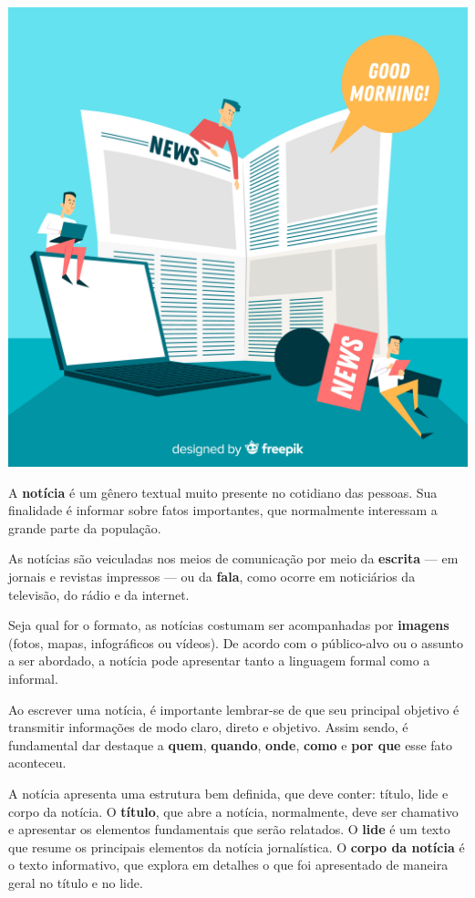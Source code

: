 \begin{conteudo}
\begin{conteudo}
\begin{conteudo}
\begin{conteudo}
{\begin{center}
\noindent\includegraphics[width=.7\textwidth]{media/image20a.jpeg}
\end{center}

A \textbf{notícia} é um gênero textual muito presente no
cotidiano das pessoas. Sua finalidade é informar sobre fatos importantes, 
que normalmente interessam a grande parte da população.

As notícias são veiculadas nos meios de comunicação por meio da
\textbf{escrita} --- em jornais e revistas impressos --- ou da \textbf{fala},
como ocorre em noticiários da televisão, do rádio e da internet.

Seja qual for o formato, as notícias costumam ser acompanhadas por
\textbf{imagens} (fotos, mapas, infográficos ou vídeos). De acordo com o
público-alvo ou o assunto a ser abordado, a notícia pode apresentar tanto a
linguagem formal como a informal.

Ao escrever uma notícia, é importante lembrar-se de que seu principal
objetivo é transmitir informações de modo claro, direto e objetivo. Assim sendo,
é fundamental dar destaque a \textbf{quem}, \textbf{quando},
\textbf{onde}, \textbf{como} e \textbf{por que} esse fato aconteceu.

A notícia apresenta uma estrutura bem definida, que deve conter: título,
lide e corpo da notícia. O \textbf{título}, que abre a notícia, normalmente,
deve ser chamativo e apresentar os elementos fundamentais que serão relatados.
O \textbf{lide} é um texto que resume os principais elementos da notícia jornalística. 
O \textbf{corpo da notícia} é o texto informativo, 
que explora em detalhes o que foi apresentado de maneira geral no título e no lide. 
}


\end{conteudo}
\end{conteudo}
\end{conteudo}
\end{conteudo}
